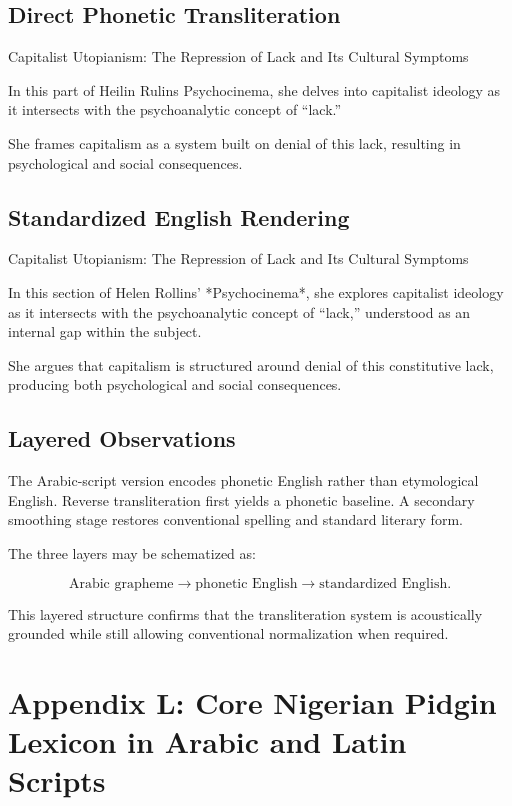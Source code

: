 \documentclass[12pt]{article}
\begin{document}
\subsection{Direct Phonetic Transliteration}

Capitalist Utopianism: The Repression of Lack and Its Cultural Symptoms

In this part of Heilin Rulins Psychocinema, she delves into capitalist ideology as it intersects with the psychoanalytic concept of “lack.”

She frames capitalism as a system built on denial of this lack, resulting in psychological and social consequences.

\subsection{Standardized English Rendering}

Capitalist Utopianism: The Repression of Lack and Its Cultural Symptoms

In this section of Helen Rollins’ *Psychocinema*, she explores capitalist ideology as it intersects with the psychoanalytic concept of “lack,” understood as an internal gap within the subject.

She argues that capitalism is structured around denial of this constitutive lack, producing both psychological and social consequences.

\subsection{Layered Observations}

The Arabic-script version encodes phonetic English rather than etymological English. Reverse transliteration first yields a phonetic baseline. A secondary smoothing stage restores conventional spelling and standard literary form.

The three layers may be schematized as:

\[
\text{Arabic grapheme} \rightarrow
\text{phonetic English} \rightarrow
\text{standardized English}.
\]

This layered structure confirms that the transliteration system is acoustically grounded while still allowing conventional normalization when required.
\section{Appendix L: Core Nigerian Pidgin Lexicon in Arabic and Latin Scripts}
\end{document}
